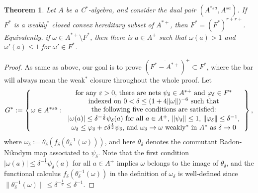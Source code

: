 \documentclass[noamsfonts,a4paper,10pt]{amsart}
\theoremstyle{plain}
\newtheorem{thm}{Theorem}[section]
\theoremstyle{definition}
\theoremstyle{remark}
\begin{document}
\begin{thm}\label{4}
Let $A$ be a C$^*$-algebra, and consider the dual pair $(A^{*sa},A^{sa})$.
If $F^*$ is a weakly$^*$ closed convex hereditary subset of $A^{*+}$, then $F^*=(F^*)^{r+r+}$.
Equivalently, if $\omega\in A^{*+}\setminus F^*$, then there is $a\in A^+$ such that $\omega(a)>1$ and $\omega'(a)\le1$ for $\omega'\in F^*$.
\end{thm}
\begin{proof}
As same as above, our goal is to prove $(\overline{F^*-A^{*+}})^+\subset F^*$, where the bar will always mean the weak$^*$ closure throughout the whole proof.
Let
\[G^*:=\left\{\omega\in A^{*sa}:\begin{tabular}{c}
for any $\varepsilon>0$, there are nets $\psi_\delta\in A^{*+}$ and $\varphi_\delta\in F^*$\\
indexed on $0<\delta\le(1+4\|\omega\|)^{-6}$ such that\\
the following five conditions are satisfied:\\
 $|\omega(a)|\le\delta^{-\frac16}\psi_\delta(a)$ for all $a\in A^+$, $\|\psi_\delta\|\le1$, $\|\varphi_\delta\|\le\delta^{-1}$,\\
$\omega_\delta\le\varphi_\delta+\varepsilon\delta^{\frac12}\psi_\delta$, and $\omega_\delta\to\omega$ weakly$^*$ in $A^*$ as $\delta\to0$
\end{tabular}\right\},\]
where $\omega_\delta:=\theta_\delta(f_\delta(\theta_\delta^{-1}(\omega)))$, and here $\theta_\delta$ denotes the commutant Radon-Nikodym map associated to $\psi_\delta$.
Note that the first condition $|\omega(a)|\le\delta^{-\frac16}\psi_\delta(a)$ for all $a\in A^+$ implies $\omega$ belongs to the image of $\theta_\delta$, and the functional calculus $f_\delta(\theta_\delta^{-1}(\omega))$ in the definition of $\omega_\delta$ is well-defined since $\|\theta_\delta^{-1}(\omega)\|\le\delta^{-\frac16}\le\delta^{-1}$.


\end{proof}
\end{document}
